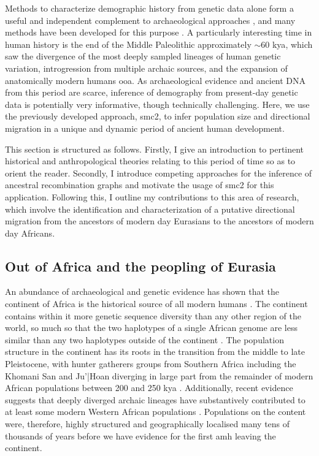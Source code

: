Methods to characterize demographic history from genetic data alone form a useful and independent complement to archaeological approaches \cite{Nielsen2017a}, and many methods have been developed for this purpose \cite{Li2011,Pickrell2012,Rasmussen2014,Schiffels2014,Mathieson2014,Steinrucken2015,Malaspinas2016,Chikhi2018,Speidel2019,Kelleher2019,Wang2019a,Albers2019}. 
A particularly interesting time in human history is the end of the Middle Paleolithic approximately $\sim$60 \gls{kya}, which saw the divergence of the most deeply sampled lineages of human genetic variation, introgression from multiple archaic sources, and the expansion of anatomically modern humans \gls{ooa}. 
As archaeological evidence and ancient DNA from this period are scarce, inference of demography from present-day genetic data is potentially very informative, though technically challenging. Here, we use the previously developed approach, \gls{smc2}, to infer population size and directional migration in a unique and dynamic period of ancient human development.

This section is structured as follows. Firstly, I give an introduction to pertinent historical and anthropological theories relating to this period of time so as to orient the reader. Secondly, I introduce competing approaches for the inference of ancestral recombination graphs and motivate the usage of \gls{smc2} for this application. Following this, I outline my contributions to this area of research, which involve the identification and characterization of a putative directional migration from the ancestors of modern day Eurasians to the ancestors of modern day Africans. 


\subsection{Out of Africa and the peopling of Eurasia}

An abundance of archaeological and genetic evidence has shown that the continent of Africa is the historical source of all modern humans \cite{Lopez2015}. The continent contains within it more genetic sequence diversity than any other region of the world, so much so that the two haplotypes of a single African genome are less similar than any two haplotypes outside of the continent \cite{Mallick2016}. The population structure in the continent has its roots in the transition from the middle to late Pleistocene, with hunter gatherers groups from Southern Africa including the Khomani San and Ju'|Hoan diverging in large part from the remainder of modern African populations between 200 and 250 \gls{kya} \cite{Lipson2019}. Additionally, recent evidence suggests that deeply diverged archaic lineages have substantively contributed to at least some modern Western African populations \cite{Durvasula2019}. Populations on the content were, therefore, highly structured and geographically localised many tens of thousands of years before we have evidence for the first \gls{amh} leaving the continent.    

